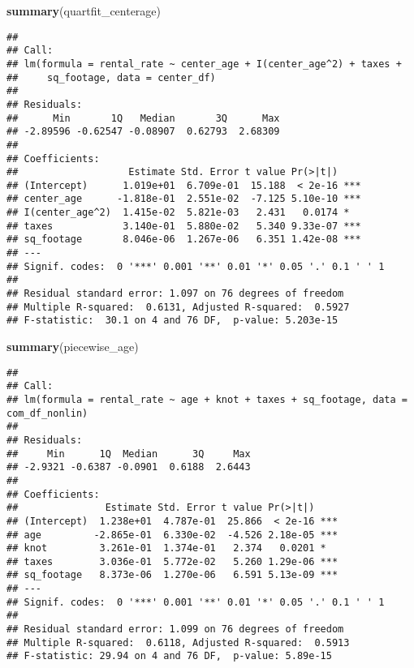 \documentclass[]{article}
\newenvironment{Shaded}{\begin{snugshade}}{\end{snugshade}}
\newcommand{\KeywordTok}[1]{\textcolor[rgb]{0.13,0.29,0.53}{\textbf{#1}}}
\newcommand{\NormalTok}[1]{#1}
\begin{document}
\begin{Shaded}
\begin{Highlighting}[]
\KeywordTok{summary}\NormalTok{(quartfit_centerage)}
\end{Highlighting}
\end{Shaded}

\begin{verbatim}
## 
## Call:
## lm(formula = rental_rate ~ center_age + I(center_age^2) + taxes + 
##     sq_footage, data = center_df)
## 
## Residuals:
##      Min       1Q   Median       3Q      Max 
## -2.89596 -0.62547 -0.08907  0.62793  2.68309 
## 
## Coefficients:
##                   Estimate Std. Error t value Pr(>|t|)    
## (Intercept)      1.019e+01  6.709e-01  15.188  < 2e-16 ***
## center_age      -1.818e-01  2.551e-02  -7.125 5.10e-10 ***
## I(center_age^2)  1.415e-02  5.821e-03   2.431   0.0174 *  
## taxes            3.140e-01  5.880e-02   5.340 9.33e-07 ***
## sq_footage       8.046e-06  1.267e-06   6.351 1.42e-08 ***
## ---
## Signif. codes:  0 '***' 0.001 '**' 0.01 '*' 0.05 '.' 0.1 ' ' 1
## 
## Residual standard error: 1.097 on 76 degrees of freedom
## Multiple R-squared:  0.6131, Adjusted R-squared:  0.5927 
## F-statistic:  30.1 on 4 and 76 DF,  p-value: 5.203e-15
\end{verbatim}

\begin{Shaded}
\begin{Highlighting}[]
\KeywordTok{summary}\NormalTok{(piecewise_age)}
\end{Highlighting}
\end{Shaded}

\begin{verbatim}
## 
## Call:
## lm(formula = rental_rate ~ age + knot + taxes + sq_footage, data = com_df_nonlin)
## 
## Residuals:
##     Min      1Q  Median      3Q     Max 
## -2.9321 -0.6387 -0.0901  0.6188  2.6443 
## 
## Coefficients:
##               Estimate Std. Error t value Pr(>|t|)    
## (Intercept)  1.238e+01  4.787e-01  25.866  < 2e-16 ***
## age         -2.865e-01  6.330e-02  -4.526 2.18e-05 ***
## knot         3.261e-01  1.374e-01   2.374   0.0201 *  
## taxes        3.036e-01  5.772e-02   5.260 1.29e-06 ***
## sq_footage   8.373e-06  1.270e-06   6.591 5.13e-09 ***
## ---
## Signif. codes:  0 '***' 0.001 '**' 0.01 '*' 0.05 '.' 0.1 ' ' 1
## 
## Residual standard error: 1.099 on 76 degrees of freedom
## Multiple R-squared:  0.6118, Adjusted R-squared:  0.5913 
## F-statistic: 29.94 on 4 and 76 DF,  p-value: 5.89e-15
\end{verbatim}
\end{document}
